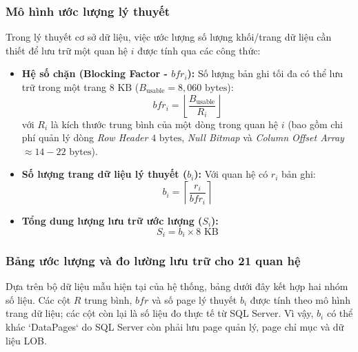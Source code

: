 \subsubsection{Mô hình ước lượng lý thuyết}

Trong lý thuyết cơ sở dữ liệu, việc ước lượng số lượng khối/trang dữ liệu cần thiết để lưu trữ một quan hệ $i$ được tính qua các công thức:

\begin{itemize}
    \item \textbf{Hệ số chặn (Blocking Factor - $bfr_i$):} Số lượng bản ghi tối đa có thể lưu trữ trong một trang $8\text{ KB}$ ($B_{\text{usable}} = 8{,}060\text{ bytes}$):
    \[
    bfr_i = \left\lfloor \frac{B_{\text{usable}}}{R_i} \right\rfloor
    \]
    với $R_i$ là kích thước trung bình của một dòng trong quan hệ $i$ (bao gồm chi phí quản lý dòng \textit{Row Header} $4\text{ bytes}$, \textit{Null Bitmap} và \textit{Column Offset Array} $\approx 14 - 22\text{ bytes}$).

    \item \textbf{Số lượng trang dữ liệu lý thuyết ($b_i$):} Với quan hệ có $r_i$ bản ghi:
    \[
    b_i = \left\lceil \frac{r_i}{bfr_i} \right\rceil
    \]

    \item \textbf{Tổng dung lượng lưu trữ ước lượng ($S_i$):}
    \[
    S_i = b_i \times 8\text{ KB}
    \]
\end{itemize}

\subsubsection{Bảng ước lượng và đo lường lưu trữ cho 21 quan hệ}

Dựa trên bộ dữ liệu mẫu hiện tại của hệ thống, bảng dưới đây kết hợp hai nhóm số liệu. Các cột $R$ trung bình, $bfr$ và số page lý thuyết $b_i$ được tính theo mô hình trang dữ liệu; các cột còn lại là số liệu đo thực tế từ SQL Server. Vì vậy, $b_i$ có thể khác `DataPages` do SQL Server còn phải lưu page quản lý, page chỉ mục và dữ liệu LOB.

